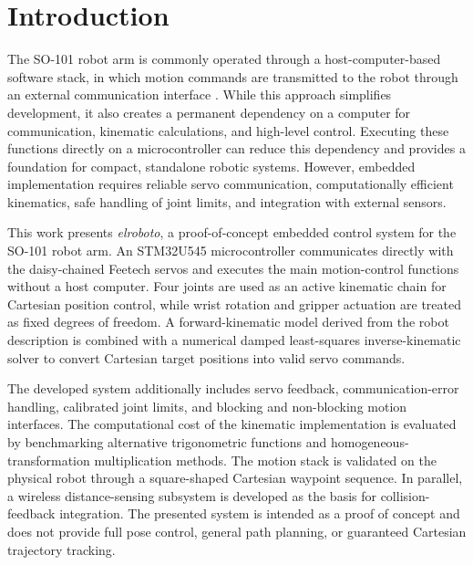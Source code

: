 \section{Introduction}

The SO-101 robot arm is commonly operated through a host-computer-based software stack, in which motion commands are transmitted to the robot through an external communication interface \cite{lerobot_so101}. While this approach simplifies development, it also creates a permanent dependency on a computer for communication, kinematic calculations, and high-level control. Executing these functions directly on a microcontroller can reduce this dependency and provides a foundation for compact, standalone robotic systems. However, embedded implementation requires reliable servo communication, computationally efficient kinematics, safe handling of joint limits, and integration with external sensors.

This work presents \textit{elroboto}, a proof-of-concept embedded control system for the SO-101 robot arm. An STM32U545 microcontroller communicates directly with the daisy-chained Feetech servos and executes the main motion-control functions without a host computer. Four joints are used as an active kinematic chain for Cartesian position control, while wrist rotation and gripper actuation are treated as fixed degrees of freedom. A forward-kinematic model derived from the robot description is combined with a numerical damped least-squares inverse-kinematic solver to convert Cartesian target positions into valid servo commands.

The developed system additionally includes servo feedback, communication-error handling, calibrated joint limits, and blocking and non-blocking motion interfaces. The computational cost of the kinematic implementation is evaluated by benchmarking alternative trigonometric functions and homogeneous-transformation multiplication methods. The motion stack is validated on the physical robot through a square-shaped Cartesian waypoint sequence. In parallel, a wireless distance-sensing subsystem is developed as the basis for collision-feedback integration. The presented system is intended as a proof of concept and does not provide full pose control, general path planning, or guaranteed Cartesian trajectory tracking.